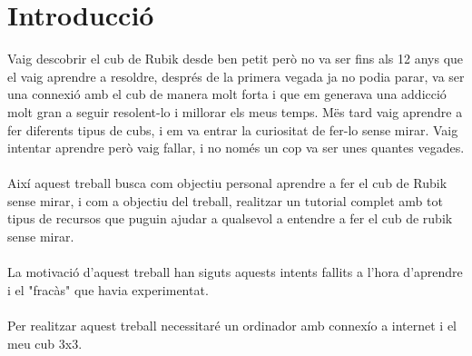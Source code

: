 \part*{Introducció}

Vaig descobrir el cub de Rubik desde ben petit però no va ser fins als 12 anys que el vaig aprendre a resoldre, després de la primera vegada ja no podia parar, va ser una connexió amb el cub de manera molt forta i que em generava una addicció molt gran a seguir resolent-lo i millorar els meus temps.
Mës tard vaig aprendre a fer diferents tipus de cubs, i em va entrar la curiositat de fer-lo sense mirar. Vaig intentar aprendre però vaig fallar, i no només un cop va ser unes quantes vegades.
\\\\Així aquest treball busca com objectiu personal aprendre a fer el cub de Rubik sense mirar, i com a objectiu del treball, realitzar un tutorial complet amb tot tipus de recursos que puguin ajudar a qualsevol a entendre a fer el cub de rubik sense mirar.
\\\\La motivació d'aquest treball han siguts aquests intents fallits a l'hora d'aprendre i el "fracàs" que havia experimentat.
\\\\Per realitzar aquest treball necessitaré un ordinador amb connexío a internet i el meu cub 3x3.



